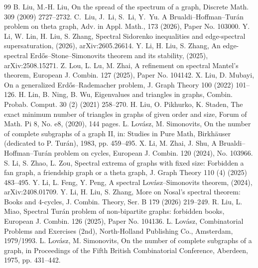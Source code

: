 \documentclass[10pt,a4paper]{amsart}
\begin{document}
\begin{thebibliography}{99}
 B. Liu, M.-H. Liu, On the spread of the spectrum of a graph, Discrete Math. 309 (2009) 2727--2732.
 C.~Liu, J.~Li, S.~Li, Y.~Yu. A {Brualdi--Hoffman--Tur\'{a}n} problem on theta graph, {Adv. in Appl. Math.}, 173 (2026), Paper No. 103000.
 Y. Li, W. Lin, H. Liu, S. Zhang, Spectral Sidorenko inequalities and edge-spectral supersaturation, (2026), arXiv:2605.26614.
 Y. Li, H. Liu, S. Zhang, An edge-spectral Erd\H{o}s--Stone--Simonovits theorem and its stability, (2025), arXiv:2508.15271.
 Z. Lou, L. Lu, M. Zhai, A refinement on spectral Mantel's theorem, European J. Combin. 127 (2025), Paper No. 104142.
 X. Liu, D. Mubayi, On a generalized Erd\H{o}s--Rademacher problem, J. Graph Theory 100 (2022) 101--126.
 H. Lin, B. Ning, B. Wu, Eigenvalues and triangles in graphs, Combin. Probab. Comput. 30 (2) (2021) 258--270.
 H. Liu, O. Pikhurko, K. Staden, The exact minimum number of triangles in graphs of given order and size, Forum of Math. Pi 8, No. e8, (2020), 144 pages.
 L. Lov\'{a}sz, M. Simonovits, On the number of complete subgraphs of a graph II, in: Studies in Pure Math, Birkh\"{a}user (dedicated to P. Tur\'{a}n), 1983, pp. 459--495.
 X. Li, M. Zhai, J. Shu, A Brualdi--Hoffman--Tur\'{a}n problem on cycles, European J. Combin. 120 (2024), No. 103966.
 S. Li, S. Zhao, L. Zou, Spectral extrema of graphs with fixed size: Forbidden a fan graph, a friendship graph or a theta graph, J. Graph Theory 110 (4) (2025) 483--495.
 Y. Li, L. Feng, Y. Peng, A spectral Lov\'asz--Simonovits theorem, (2024), arXiv:2408.01709.
 Y. Li, H. Liu, S. Zhang, More on Nosal's spectral theorem: Books and $4$-cycles, {J. Combin. Theory, Ser. B} {179} (2026) 219--249.
 R. Liu, L. Miao, Spectral Tur\'{a}n problem of non-bipartite graphs: forbidden books, European J. Combin. 126 (2025), Paper No. 104136.
 L. Lov\'{a}sz, Combinatorial Problems and Exercises (2nd), North-Holland Publishing Co., Amsterdam, 1979/1993.
 L. Lov\'asz, M. Simonovits, On the number of complete subgraphs of a graph, in {Proceedings of the Fifth British Combinatorial Conference}, Aberdeen, 1975, pp. 431--442.

\end{thebibliography}
\end{document}
